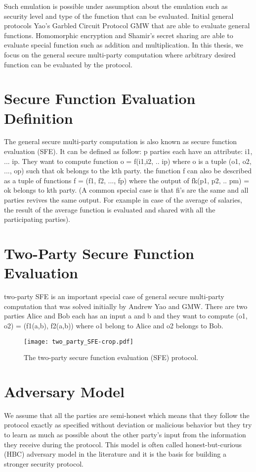 Such emulation is possible under assumption about the emulation such as security level and type of the function that can be evaluated.
Initial general protocols Yao's Garbled Circuit Protocol GMW that are able to evaluate general functions.
Homomorphic encryption and Shamir's secret sharing are able to evaluate special function such as addition and multiplication.
In this thesis, we focus on the general secure multi-party computation where arbitrary desired function can be evaluated by the protocol.

\section{Secure Function Evaluation Definition}
The general secure multi-party computation is also known as secure function evaluation (SFE). It can be defined as follow: p parties each have an attribute: i1, ... ip. They want to compute function o = f(i1,i2, .. ip) where o is a tuple (o1, o2, ..., op) such that ok belongs to the kth party.
the function f can also be described as a tuple of functions f = (f1, f2, ...,  fp) where the output of fk(p1, p2, .. pm) = ok belongs to kth party.
(A common special case is that fi's are the same and all parties revives the same output. For example in case of the average of salaries, the result of the average function is evaluated and shared with all the participating parties).

\section{Two-Party Secure Function Evaluation}
two-party SFE is an important special case of general secure multi-party computation that was solved initially by Andrew Yao and GMW.
There are two parties Alice and Bob each has an input a and b and they want to compute (o1, o2) = (f1(a,b), f2(a,b)) where o1 belong to Alice and o2 belongs to Bob.

\begin{figure}[ht]
\centering
\texttt{[image: two\_party\_SFE-crop.pdf]}
\caption{The two-party secure function evaluation (SFE) protocol.}
\label{fig:globalflow}
\end{figure}

\section{Adversary Model}
We assume that all the parties are semi-honest which means that they follow the protocol exactly as specified without deviation or malicious behavior but they try to learn as much as possible about the other party's input from the information they receive during the protocol.
This model is often called honest-but-curious (HBC) adversary model in the literature and it is the basis for building a stronger security protocol.

